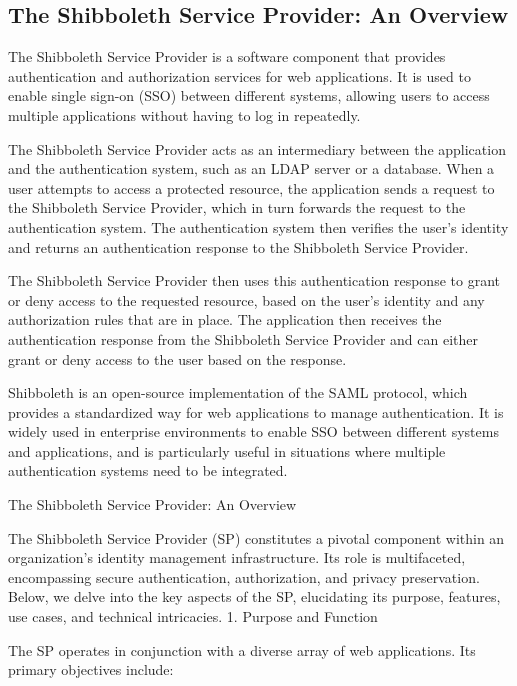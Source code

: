 \documentclass{report}
\begin{document}
\subsection{The Shibboleth Service Provider: An Overview}
The Shibboleth Service Provider is a software component that provides authentication and authorization services for web applications. It is used to enable single 
sign-on (SSO) between different systems, allowing users to access multiple applications without having to log in repeatedly.

The Shibboleth Service Provider acts as an intermediary between the application and the authentication system, such as an LDAP server or a database. When a user 
attempts to access a protected resource, the application sends a request to the Shibboleth Service Provider, which in turn forwards the request to the 
authentication system. The authentication system then verifies the user's identity and returns an authentication response to the Shibboleth Service Provider.

The Shibboleth Service Provider then uses this authentication response to grant or deny access to the requested resource, based on the user's identity and any 
authorization rules that are in place. The application then receives the authentication response from the Shibboleth Service Provider and can either grant or deny
access to the user based on the response.

Shibboleth is an open-source implementation of the SAML protocol, which provides a standardized way for web applications to manage authentication. It is widely used in enterprise environments to enable SSO between different systems and applications, and is particularly useful in situations 
where multiple authentication systems need to be integrated.






The Shibboleth Service Provider: An Overview

The Shibboleth Service Provider (SP) constitutes a pivotal component within an organization’s identity management infrastructure. Its role is multifaceted, encompassing secure authentication, authorization, and privacy preservation. Below, we delve into the key aspects of the SP, elucidating its purpose, features, use cases, and technical intricacies.
1. Purpose and Function

The SP operates in conjunction with a diverse array of web applications. Its primary objectives include:
\end{document}
